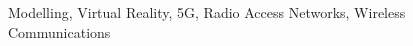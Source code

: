 \begin{keywords}
Modelling, Virtual Reality, 5G, Radio Access Networks, Wireless Communications
\end{keywords}
\clearpage
\thispagestyle{empty}
\cleardoublepage